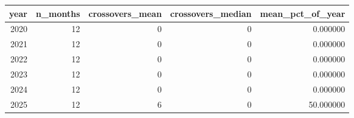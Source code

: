 \begin{tabular}{rrrrr}
\toprule
year & n_months & crossovers_mean & crossovers_median & mean_pct_of_year \\
\midrule
2020 & 12 & 0 & 0 & 0.000000 \\
2021 & 12 & 0 & 0 & 0.000000 \\
2022 & 12 & 0 & 0 & 0.000000 \\
2023 & 12 & 0 & 0 & 0.000000 \\
2024 & 12 & 0 & 0 & 0.000000 \\
2025 & 12 & 6 & 0 & 50.000000 \\
\bottomrule
\end{tabular}
